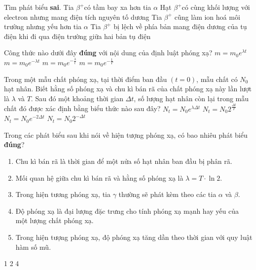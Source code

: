 \begin{ex}
Tìm phát biểu \textbf{sai}.
	\choice
	{Tia $\beta^{+}$có tầm bay xa hơn tia $\alpha$}
	{Hạt $\beta^{+}$có cùng khối lượng với electron nhưng mang điện tích nguyên tố dương}
	{Tia $\beta^{+}$ cũng làm ion hoá môi trường nhưng yếu hơn tia $\alpha$}
	{\True Tia $\beta^{+}$ bị lệch về phía bản mang điện dương của tụ điện khi đi qua điện trường giữa hai bản tụ điện}
	\loigiai{}
\end{ex}
\begin{ex}
	Công thức nào dưới đây \textbf{đúng} với nội dung của định luật phóng xạ?
	\choice
	{$m=m_0e^{\lambda t}$}
	{\True $m=m_0e^{-\lambda t}$}
	{$m=m_0 e^{-\frac{\lambda}{t}}$}
	{$m=m_0 e^{-\frac{1}{T}}$}
	\loigiai{}
\end{ex}
\begin{ex}
	Trong một mẫu chất phóng xạ, tại thời điểm ban đầu $(t=0)$, mẫu chất có $N_0$ hạt nhân. Biết hằng số phóng xạ và chu kì bán rã của chất phóng xạ này lần lượt là $\lambda$ và $T$. Sau đó một khoảng thời gian $\Delta t$, số lượng hạt nhân còn lại trong mẫu chất đó được xác định bằng biểu thức nào sau đây?
	\choice
	{$N_{t}=N_0 e^{\lambda \Delta t}$}
	{$N_{t}=N_0 2^{\frac{\Delta t}{T}}$}
	{\True $N_{t}=N_0 e^{-2 \Delta t}$}
	{$N_{t}=N_0 2^{-\Delta t}$}
	\loigiai{}
\end{ex}
\begin{ex}
	Trong các phát biểu sau khi nói về hiện tượng phóng xạ, có bao nhiêu phát biểu \textbf{đúng}?
	\begin{enumerate}[label=(\arabic*)]
		\item Chu kì bán rã là thời gian để một nửa số hạt nhân ban đầu bị phân rã.
		\item Mối quan hệ giữa chu kì bán rã và hằng số phóng xạ là $\lambda=T \cdot \ln 2$.
		\item Trong hiện tương phóng xạ, tia $\gamma$ thường sẽ phát kèm theo các tia $\alpha$ và $\beta$.
		\item Độ phóng xạ là đại lượng đặc trưng cho tính phóng xạ mạnh hay yếu của một lượng chất phóng xạ.
		\item Trong hiện tượng phóng xạ, độ phóng xạ tăng dần theo thời gian với quy luật hàm số mũ.
	\end{enumerate}
	\choice
	{1}
	{2}
	{}
	{4}
\end{ex}
